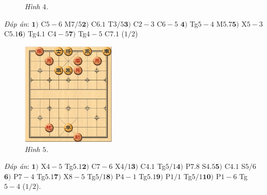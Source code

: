 \begin{multicols}{2}
\begin{figure}[H]
		\caption{\small\textit{\color{gocco}Hình $4$.}}
		\vspace*{-10pt}
	\end{figure}
	\textit{Đáp án}: $\pmb{1)}$ C$5-6$ M$7/5$\quad $\pmb{2)}$ C$6.1$ T$3/5$\quad $\pmb{3)}$ C$2-3$ C$6-5$ \quad $\pmb{4)}$ Tg$5-4$ M$5.7$\quad $\pmb{5)}$ X$5-3$ C$5.1$\quad $\pmb{6)}$ Tg$4.1$ C$4-5$\quad $\pmb{7)}$ Tg$4-5$ C$7.1$ ($1/2$)
	\begin{figure}[H]
		\vspace*{-5pt}
		\centering
		\captionsetup{labelformat= empty, justification=centering}
		\includegraphics[width= 0.4\textwidth]{5}
		\caption{\small\textit{\color{gocco}Hình $5$.}}
		\vspace*{-10pt}
	\end{figure}
	\textit{Đáp án}: $\pmb{1)}$ X$4-5$ Tg$5.1$\quad $\pmb{2)}$ C$7-6$ X$4/1$\quad $\pmb{3)}$ C$4.1$ Tg$5/1$\quad $\pmb{4)}$ P$7.8$ S$4.5$\quad $\pmb{5)}$ C$4.1$ S$5/6$\quad $\pmb{6)}$ P$7-4$ Tg$5.1$\quad $\pmb{7)}$ X$8-5$ Tg$5/1$\quad $\pmb{8)}$ P$4-1$ Tg$5.1$\quad $\pmb{9)}$ P$1/1$ Tg$5/1$\quad $\pmb{10)}$ P$1-6$ Tg$5-4$ ($1/2$).
\end{multicols}




